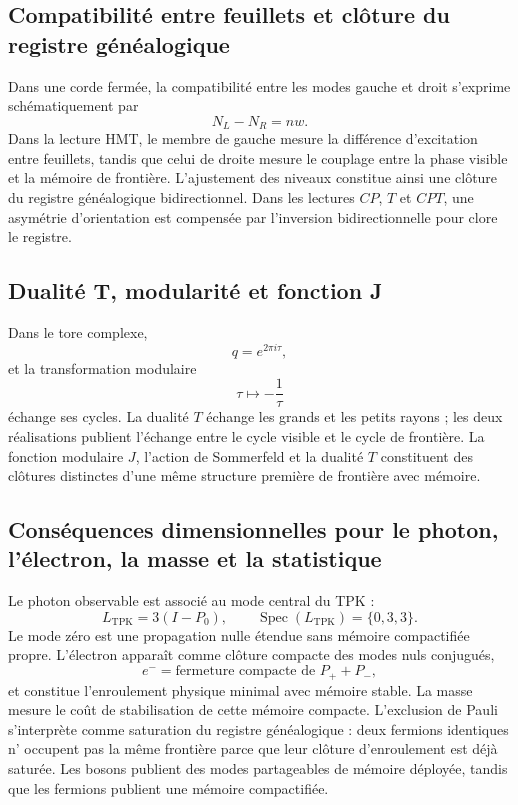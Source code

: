 \subsection{Compatibilité entre feuillets et clôture du registre généalogique}

Dans une corde fermée, la compatibilité entre les modes gauche et droit
s'exprime schématiquement par
\[
N_L-N_R=nw.
\]
Dans la lecture HMT, le membre de gauche mesure la différence d'excitation
entre feuillets, tandis que celui de droite mesure le couplage entre la phase visible et
la mémoire de frontière. L'ajustement des niveaux constitue ainsi une clôture du
registre généalogique bidirectionnel. Dans les lectures \(CP\), \(T\) et \(CPT\), une asymétrie
d'orientation est compensée par l'inversion bidirectionnelle pour clore le
registre.

\subsection{Dualité T, modularité et fonction J}

Dans le tore complexe,
\[
q=e^{2\pi i\tau},
\]
et la transformation modulaire
\[
\tau\longmapsto-\frac1\tau
\]
échange ses cycles. La dualité \(T\) échange les grands et les petits
rayons ; les deux réalisations publient l'échange entre le cycle visible
et le cycle de frontière. La fonction modulaire \(J\), l'action de
Sommerfeld et la dualité \(T\) constituent des clôtures distinctes d'une même
structure première de frontière avec mémoire.

\subsection{Conséquences dimensionnelles pour le photon, l'électron, la masse et la statistique}

Le photon observable est associé au mode central du TPK :
\[
L_{\mathrm{TPK}}=3(I-P_0),
\qquad
\operatorname{Spec}(L_{\mathrm{TPK}})=\{0,3,3\}.
\]
Le mode zéro est une propagation nulle étendue sans mémoire compactifiée
propre. L'électron apparaît comme clôture compacte des modes nuls
conjugués,
\[
e^-=\text{fermeture compacte de }P_++P_-,
\]
et constitue l'enroulement physique minimal avec mémoire stable. La masse
mesure le coût de stabilisation de cette mémoire compacte. L'exclusion de
Pauli s'interprète comme saturation du registre généalogique : deux fermions identiques n'
occupent pas la même frontière parce que leur clôture d'enroulement est déjà saturée.
Les bosons publient des modes partageables de mémoire déployée, tandis que les
fermions publient une mémoire compactifiée.

